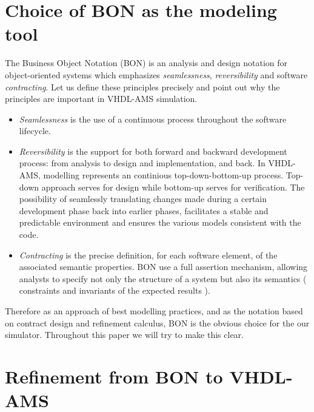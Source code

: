 \documentclass{article}
\newcommand{\todo}{\textbf{TODO:}}
\begin{document}
\section{Choice of BON as the modeling tool}
The Business Object Notation (BON) is an analysis and design notation 
for object-oriented systems  which emphasizes \emph{seamlessness}, 
\emph{reversibility} and software \emph{contracting}. Let us define 
these principles precisely and point out why the principles are 
important in VHDL-AMS simulation.
\begin{itemize}
\item \emph{Seamlessness} is the use of a continuous process 
throughout the software lifecycle.
\item \emph{Reversibility} is the support for both forward and 
backward development process: from analysis to design 
and implementation, and back.
In VHDL-AMS, modelling represents an continious top-down-bottom-up
process. Top-down approach serves for design while bottom-up
serves for verification. The possibility of seamlessly translating 
changes made during a certain development phase back into earlier phases,
facilitates a stable and predictable environment and ensures the various 
models consistent with the code.
\item \emph{Contracting} is the precise definition, for each software element, 
of the associated semantic properties. BON use a full assertion mechanism, 
allowing analysts to specify not only the structure of a system but also its
semantics ( constraints and invariants of the expected results ).
\end{itemize}

Therefore as an approach of best modelling practices, and as the notation 
based on contract design and refinement calculus, BON is the obvious choice 
for the our simulator.
Throughout this paper we will try to make this clear.  
\section{Refinement from BON to VHDL-AMS}
\end{document}
